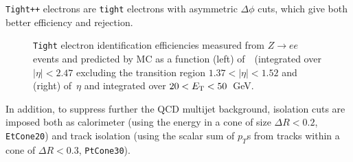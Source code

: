 \texttt{Tight++} electrons are \texttt{tight} electrons with asymmetric $\Delta\phi$ cuts, which give
both better efficiency and rejection.

\begin{figure}[tb]\begin{center}
	\caption{\texttt{Tight} electron identification efficiencies measured from $Z\to ee$ events and predicted by MC as a function (left) of~\ET\ (integrated over $|\eta|< 2.47$ excluding the transition region $1.37< |\eta|<1.52$ and (right) of~$\eta$ and integrated over $20< \ET<50$~GeV.~\cite{eperf}}
\end{center}\end{figure}



In addition, to suppress further the QCD multijet background, 
isolation cuts are imposed both as calorimeter (using the energy in a cone of size $\Delta R<0.2$, \texttt{EtCone20})
and track isolation (using the scalar sum of $p_T$s from tracks within a cone of $\Delta R<0.3$, \texttt{PtCone30}).


